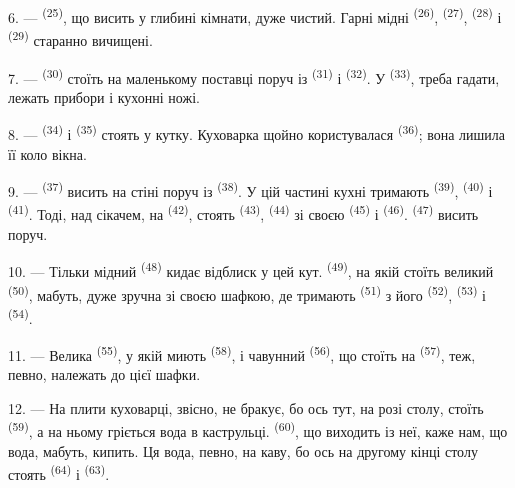 6. ---  \textsuperscript{(25)}, що висить у глибині
кімнати, дуже чистий. Гарні мідні  \textsuperscript{(26)},
 \textsuperscript{(27)},  \textsuperscript{(28)}
і  \textsuperscript{(29)} старанно вичищені.

7. ---  \textsuperscript{(30)} стоїть на маленькому поставці
поруч із  \textsuperscript{(31)} і 
\textsuperscript{(32)}. У  \textsuperscript{(33)}, треба гадати,
лежать прибори і кухонні ножі.

8. ---  \textsuperscript{(34)} і 
\textsuperscript{(35)} стоять у кутку. Куховарка щойно користувалася
 \textsuperscript{(36)}; вона лишила її коло вікна.

9. ---  \textsuperscript{(37)} висить на стіні поруч із
 \textsuperscript{(38)}. У цій частині кухні тримають
 \textsuperscript{(39)},  \textsuperscript{(40)} і
 \textsuperscript{(41)}. Тоді, над сікачем, на
 \textsuperscript{(42)}, стоять 
\textsuperscript{(43)},  \textsuperscript{(44)} зі своєю
 \textsuperscript{(45)} і  \textsuperscript{(46)}.
 \textsuperscript{(47)} висить поруч.

10. --- Тільки мідний  \textsuperscript{(48)} кидає відблиск у цей
кут.  \textsuperscript{(49)}, на якій стоїть великий
 \textsuperscript{(50)}, мабуть, дуже зручна зі своєю шафкою, де
тримають  \textsuperscript{(51)} з його
 \textsuperscript{(52)}, 
\textsuperscript{(53)} і  \textsuperscript{(54)}.

\VUsaut{4.0mm}
\VUsaut{3.0mm}

11. --- Велика  \textsuperscript{(55)}, у якій миють
 \textsuperscript{(58)}, і чавунний 
\textsuperscript{(56)}, що стоїть на 
\textsuperscript{(57)}, теж, певно, належать до цієї шафки.

12. --- На плити куховарці, звісно, не бракує, бо ось тут, на розі столу, стоїть
 \textsuperscript{(59)}, а на ньому гріється вода в
каструльці.  \textsuperscript{(60)}, що виходить із неї, каже нам,
що вода, мабуть, кипить. Ця вода, певно, на каву, бо ось на другому кінці столу
стоять  \textsuperscript{(64)} і 
\textsuperscript{(63)}.

